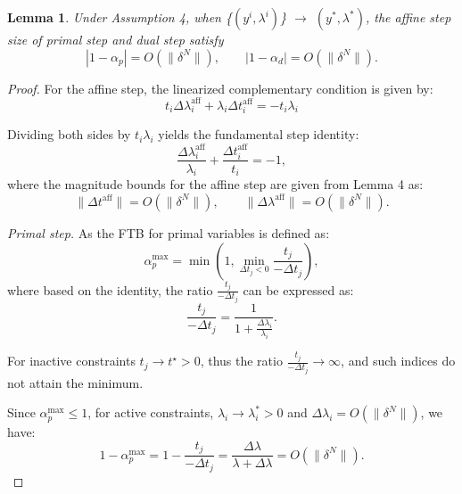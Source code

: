 \documentclass[conference]{IEEEtran}
\theoremstyle{plain}
\newtheorem{lemma}[theorem]{Lemma}
\begin{document}
\begin{lemma}
    Under Assumption 4, when \{$(y^i, \lambda^i)$\} $\rightarrow$ $(y^*, \lambda^*)$, the affine step size of primal step and dual step satisfy
    \begin{equation*}
        |1-\alpha_p| = O(\|\delta^N\|), \qquad |1-\alpha_d| = O(\|\delta^N\|).
    \end{equation*}
\end{lemma}

\begin{proof}
For the affine step, the linearized complementary condition is given by:
\begin{equation*}
t_i \Delta \lambda_i^{\mathrm{aff}} + \lambda_i \Delta t_i^{\mathrm{aff}} = -t_i \lambda_i
\end{equation*}

Dividing both sides by $t_i \lambda_i$ yields the fundamental step identity:
\begin{equation*}
\frac{\Delta \lambda_i^{\mathrm{aff}}}{\lambda_i} + \frac{\Delta t_i^{\mathrm{aff}}}{t_i} = -1,
\end{equation*}
where the magnitude bounds for the affine step are given from Lemma 4 as:
\begin{equation*}
    \|\Delta t^{\mathrm{aff}}\| = O(\|\delta^N\|), \qquad \|\Delta \lambda^{\mathrm{aff}}\| = O(\|\delta^N\|).
\end{equation*}

\emph{Primal step.}
As the FTB for primal variables is defined as:
\begin{equation*}
    \alpha_p^{\max} = \min\left(1, \min_{\Delta t_j < 0} \frac{t_j}{-\Delta t_j}\right),
\end{equation*} 
where based on the identity, the ratio $\frac{t_j}{-\Delta t_j}$ can be expressed as:
\begin{equation*}
    \frac{t_j}{-\Delta t_j} = \frac{1}{1 + \frac{\Delta \lambda_i}{\lambda_i}}.
\end{equation*}

For inactive constraints $t_j\rightarrow t^\star > 0$, thus the ratio $\frac{t_j}{-\Delta t_j}  \rightarrow \infty$, and such indices do not attain the minimum.

Since $\alpha_p^{\max} \leq 1$, for active constraints, $\lambda_i \rightarrow \lambda_i^* > 0$ 
and $\Delta \lambda_i = O(\|\delta^N\|)$, we have:
\begin{equation*}
    1 - \alpha_p^{\max} = 1 - \frac{t_j}{-\Delta t_j} = \frac{\Delta \lambda}{\lambda + \Delta \lambda} = O(\|\delta^N\|).
\end{equation*}


\end{proof}
\end{document}
